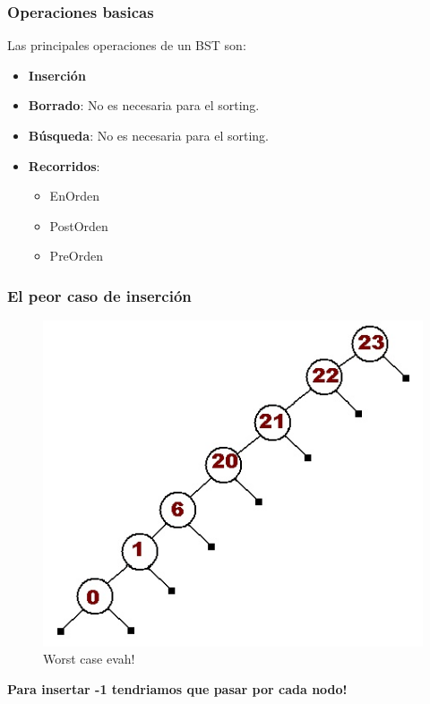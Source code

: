 \documentclass{beamer}
\begin{document}
		\begin{frame}
			\frametitle{Operaciones basicas}
			Las principales operaciones de un BST son:
			\begin{itemize}[<+->]
				\item \textbf{Inserción}
				\item \textbf{Borrado}: No es necesaria para el sorting.
				\item \textbf{Búsqueda}: No es necesaria para el sorting.
				\item \textbf{Recorridos}:
					\begin{itemize}[<+->]
						\item EnOrden
						\item PostOrden
						\item PreOrden
					\end{itemize}
			\end{itemize}
		\end{frame}

		\begin{frame}
			\frametitle{El peor caso de inserción}
			\begin{figure}
  				\centering
    			\includegraphics[scale=0.3]{lls.jpg}
  				\caption{Worst case evah!}
  				\label{fig:lls}
			\end{figure}
		
			\begin{center}
				\textbf{Para insertar -1 tendriamos que pasar por cada nodo!}
			\end{center}
		\end{frame}
\end{document}
